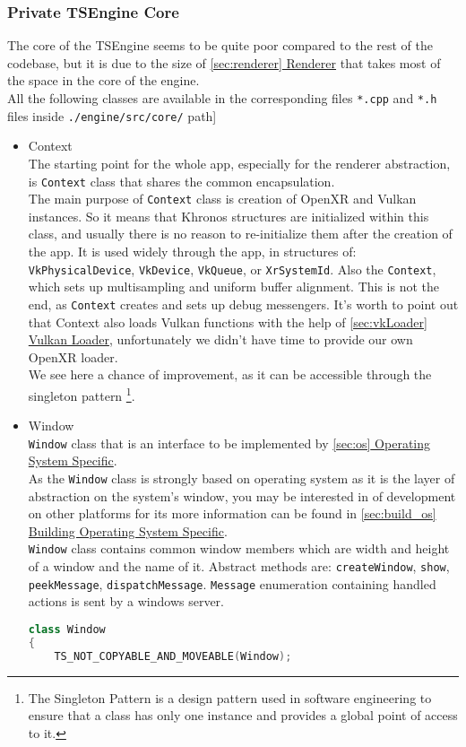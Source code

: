 \subsubsection{Private TSEngine Core}
\hspace{\parindent} The core of the TSEngine seems to be quite poor compared to the rest of the codebase, but it is due to the size of \hyperref[sec:renderer]{\ref*{sec:renderer} Renderer} that takes most of the space in the core of the engine.\\
All the following classes are available in the corresponding files \texttt{*.cpp} and \texttt{*.h} files inside \texttt{./engine/src/core/} path]\\
\begin{itemize}
    \item Context\\
    \label{context}
    The starting point for the whole app, especially for the renderer abstraction, is \texttt{Context} class that shares the common encapsulation.\\
    The main purpose of \texttt{Context} class is creation of OpenXR and Vulkan instances. So it means that Khronos structures are initialized within this class, and usually there is no reason to re-initialize them after the creation of the app. It is used widely through the app, in structures of: \texttt{VkPhysicalDevice}, \texttt{VkDevice}, \texttt{VkQueue}, or \texttt{XrSystemId}. Also the \texttt{Context}, which sets up multisampling and uniform buffer alignment. This is not the end, as \texttt{Context} creates and sets up debug messengers.
    It's worth to point out that Context also loads Vulkan functions with the help of \hyperref[sec:vkLoader]{\ref*{sec:vkLoader} Vulkan Loader}, unfortunately we didn't have time to provide our own OpenXR loader.\\
    We see here a chance of improvement, as it can be accessible through the singleton pattern
    \footnote{The Singleton Pattern is a design pattern used in software engineering to ensure that a class has only one instance and provides a global point of access to it.}.
    \item Window\\
    \label{window}
    \texttt{Window} class that is an interface to be implemented by \hyperref[sec:os]{\ref*{sec:os} Operating System Specific}.\\
    As the \texttt{Window} class is strongly based on operating system as it is the layer of abstraction on the system's window, you may be interested in of development on other platforms for its more information can be found in \hyperref[sec:build_os]{\ref*{sec:build_os} Building Operating System Specific}.\\
    \texttt{Window} class contains common window members which are width and height of a window and the name of it. Abstract methods are: \texttt{createWindow}, \texttt{show}, \texttt{peekMessage}, \texttt{dispatchMessage}. \texttt{Message} enumeration containing handled actions is sent by a windows server. 
\begin{lstlisting}[language=c++, caption=Engine window interface (./engine/src/core/window.h)]
class Window
{
    TS_NOT_COPYABLE_AND_MOVEABLE(Window);


\end{lstlisting}
\end{itemize}
